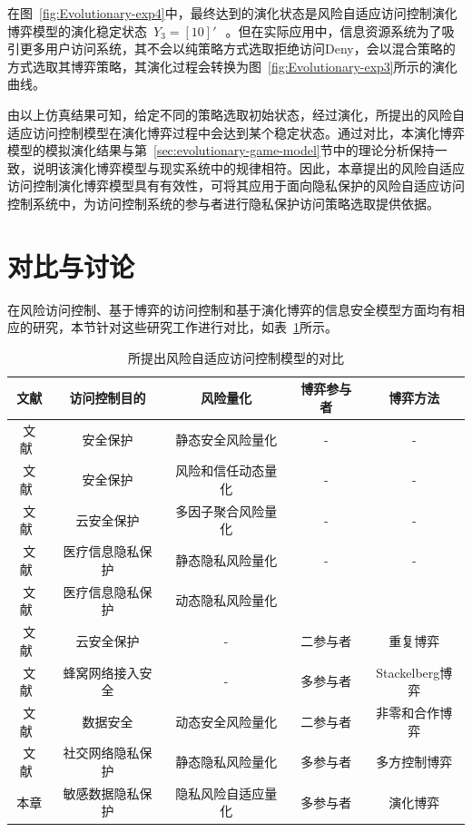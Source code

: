 \begin{enumerate}
 	在图~\ref{fig:Evolutionary-exp4}中，最终达到的演化状态是风险自适应访问控制演化博弈模型的演化稳定状态~${{Y}_{3}}=[10]'~$~。但在实际应用中，信息资源系统为了吸引更多用户访问系统，其不会以纯策略方式选取拒绝访问Deny，会以混合策略的方式选取其博弈策略，其演化过程会转换为图~\ref{fig:Evolutionary-exp3}所示的演化曲线。
 \end{enumerate}


 由以上仿真结果可知，给定不同的策略选取初始状态，经过演化，所提出的风险自适应访问控制模型在演化博弈过程中会达到某个稳定状态。通过对比，本演化博弈模型的模拟演化结果与第~\ref{sec:evolutionary-game-model}节中的理论分析保持一致，说明该演化博弈模型与现实系统中的规律相符。因此，本章提出的风险自适应访问控制演化博弈模型具有有效性，可将其应用于面向隐私保护的风险自适应访问控制系统中，为访问控制系统的参与者进行隐私保护访问策略选取提供依据。
 
 \section{对比与讨论}
 
 在风险访问控制、基于博弈的访问控制和基于演化博弈的信息安全模型方面均有相应的研究，本节针对这些研究工作进行对比，如表~\ref{tab:game-model-comparision}所示。
\begin{table}[htbp]
	\caption{所提出风险自适应访问控制模型的对比}
	\label{tab:game-model-comparision}
	\centering
	\begin{tabular}{ccccc}%
		
		\toprule
		文献  &	访问控制目的&	风险量化&	博弈参与者&	博弈方法\\
		\midrule
		文献~\cite{ni2010risk}&
		安全保护&	静态安全风险量化&	-&	-\\
		文献~\cite{shaikh2012dynamic}&
		安全保护&	风险和信任动态量化&	-&	-\\
		文献~\cite{santos2016framework}&
		云安全保护&	多因子聚合风险量化&	-&	-\\
		文献~\cite{wang2011quantified}&
		医疗信息隐私保护&	静态隐私风险量化&	-&	-\\
		文献~\cite{zhang2018privacy}&
		医疗信息隐私保护&	动态隐私风险量化\\		
		文献~\cite{gao2018game}&
		云安全保护&	-&	二参与者&	重复博弈\\
		文献~\cite{liu2016dynamic}&
		蜂窝网络接入安全&	-	&多参与者&	Stackelberg博弈\\
		文献~\cite{helil2017non}&
		数据安全&	动态安全风险量化&	二参与者&	非零和合作博弈\\
		文献~\cite{hu2014game}&
		社交网络隐私保护&	静态隐私风险量化&	多参与者&	多方控制博弈\\
		本章&	敏感数据隐私保护&	隐私风险自适应量化&	多参与者&	演化博弈\\
	
		\bottomrule
	\end{tabular}
\end{table}

